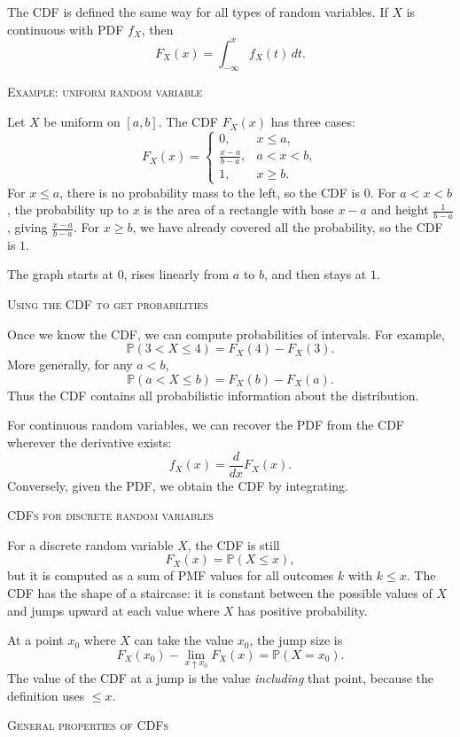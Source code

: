 The CDF is defined the same way for all types of random variables.  
If \(X\) is continuous with PDF \(f_X\), then
\[
F_X(x) = \int_{-\infty}^{x} f_X(t)\,dt.
\]

\bigskip\textsc{Example: uniform random variable}

Let \(X\) be uniform on \([a,b]\).  
The CDF \(F_X(x)\) has three cases:
\[
F_X(x) =
\begin{cases}
0, & x \le a, \\
\displaystyle \frac{x-a}{b-a}, & a < x < b, \\
1, & x \ge b.
\end{cases}
\]
For \(x \le a\), there is no probability mass to the left, so the CDF is \(0\).  
For \(a < x < b\), the probability up to \(x\) is the area of a rectangle with base \(x-a\) and height \(\frac{1}{b-a}\), giving \(\frac{x-a}{b-a}\).  
For \(x \ge b\), we have already covered all the probability, so the CDF is \(1\).

The graph starts at \(0\), rises linearly from \(a\) to \(b\), and then stays at \(1\).

\bigskip\textsc{Using the CDF to get probabilities}

Once we know the CDF, we can compute probabilities of intervals.  
For example,
\[
\mathbb{P}(3 < X \le 4) = F_X(4) - F_X(3).
\]
More generally, for any \(a < b\),
\[
\mathbb{P}(a < X \le b) = F_X(b) - F_X(a).
\]
Thus the CDF contains all probabilistic information about the distribution.

For continuous random variables, we can recover the PDF from the CDF wherever the derivative exists:
\[
f_X(x) = \frac{d}{dx} F_X(x).
\]
Conversely, given the PDF, we obtain the CDF by integrating.

\bigskip\textsc{CDFs for discrete random variables}

For a discrete random variable \(X\), the CDF is still
\[
F_X(x) = \mathbb{P}(X \le x),
\]
but it is computed as a sum of PMF values for all outcomes \(k\) with \(k \le x\).  
The CDF has the shape of a staircase: it is constant between the possible values of \(X\) and jumps upward at each value where \(X\) has positive probability.

At a point \(x_0\) where \(X\) can take the value \(x_0\), the jump size is
\[
F_X(x_0) - \lim_{x \uparrow x_0} F_X(x) = \mathbb{P}(X = x_0).
\]
The value of the CDF at a jump is the value \emph{including} that point, because the definition uses \(\le x\).

\bigskip\textsc{General properties of CDFs}

